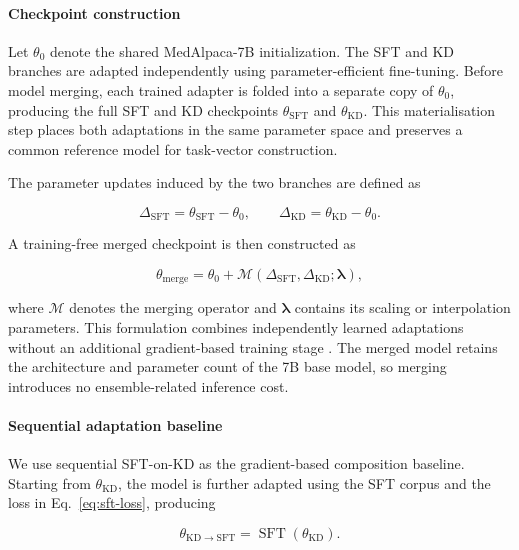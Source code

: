 \documentclass[conference]{IEEEtran}
\begin{document}
\paragraph{Checkpoint construction}
Let $\theta_0$ denote the shared MedAlpaca-7B initialization. The SFT and KD branches are adapted independently using parameter-efficient fine-tuning. Before model merging, each trained adapter is folded into a separate copy of $\theta_0$, producing the full SFT and KD checkpoints $\theta_{\mathrm{SFT}}$ and $\theta_{\mathrm{KD}}$. This materialisation step places both adaptations in the same parameter space and preserves a common reference model for task-vector construction.

The parameter updates induced by the two branches are defined as

\begin{equation}
\Delta_{\mathrm{SFT}}
=
\theta_{\mathrm{SFT}}-\theta_0,
\qquad
\Delta_{\mathrm{KD}}
=
\theta_{\mathrm{KD}}-\theta_0.
\label{eq:merge-task-vectors}
\end{equation}

A training-free merged checkpoint is then constructed as

\begin{equation}
\theta_{\mathrm{merge}}
=
\theta_0+
\mathcal{M}
\left(
\Delta_{\mathrm{SFT}},
\Delta_{\mathrm{KD}};\boldsymbol{\lambda}
\right),
\label{eq:general-model-merge}
\end{equation}

where $\mathcal{M}$ denotes the merging operator and $\boldsymbol{\lambda}$ contains its scaling or interpolation parameters. This formulation combines independently learned adaptations without an additional gradient-based training stage \cite{ilharco2022editing}. The merged model retains the architecture and parameter count of the 7B base model, so merging introduces no ensemble-related inference cost.

\paragraph{Sequential adaptation baseline}

We use sequential SFT-on-KD as the gradient-based composition baseline. Starting from $\theta_{\mathrm{KD}}$, the model is further adapted using the SFT corpus and the loss in Eq.~\eqref{eq:sft-loss}, producing

\begin{equation}
\theta_{\mathrm{KD}\rightarrow\mathrm{SFT}}
=
\operatorname{SFT}
\left(
\theta_{\mathrm{KD}}
\right).
\label{eq:sequential-kd-sft}
\end{equation}
\end{document}
